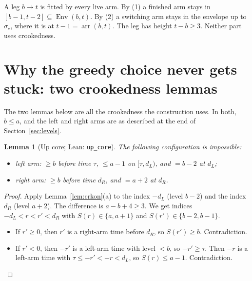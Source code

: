 \documentclass[11pt]{article}
\newtheorem{lemma}[theorem]{Lemma}
\theoremstyle{definition}
\theoremstyle{remark}
\newcommand{\Env}{\operatorname{Env}}
\newcommand{\arr}{\operatorname{arr}}
\newcommand{\lean}[1]{\texttt{#1}}
\begin{document}
A leg $b\to t$ is fitted by every live arm. By (1) a finished arm stays in
$[b-1,t-2]\subseteq\Env(b,t)$. By (2) a switching arm stays in the envelope up
to $\sigma_e$, where it is at $t-1=\arr(b,t)$. The leg has height $t-b\ge3$.
Neither part uses crookedness.

\section{Why the greedy choice never gets stuck: two crookedness lemmas}\label{sec:cores}

The two lemmas below are all the crookedness the construction uses. In both,
$b\le a$, and the left and right arms are as described at the end of
Section~\ref{sec:levels}.

\begin{lemma}[Up core; Lean: \lean{up\_core}]\label{lem:upcore}
The following configuration is impossible:
\begin{itemize}
\item left arm: $\ge b$ before time $\tau$, $\le a-1$ on $[\tau,d_L)$, and
$=b-2$ at $d_L$;
\item right arm: $\ge b$ before time $d_R$, and $=a+2$ at $d_R$.
\end{itemize}
\end{lemma}
\begin{proof}
Apply Lemma~\ref{lem:crkon}(a) to the index $-d_L$ (level $b-2$) and the index
$d_R$ (level $a+2$). The difference is $a-b+4\ge3$. We get indices
$-d_L<r<r'<d_R$ with $S(r)\in\{a,a+1\}$ and $S(r')\in\{b-2,b-1\}$.
\begin{itemize}
\item If $r'\ge0$, then $r'$ is a right-arm time before $d_R$, so
$S(r')\ge b$. Contradiction.
\item If $r'<0$, then $-r'$ is a left-arm time with level $<b$, so
$-r'\ge\tau$. Then $-r$ is a left-arm time with $\tau\le-r'<-r<d_L$, so
$S(r)\le a-1$. Contradiction.\qedhere
\end{itemize}
\end{proof}
\end{document}
